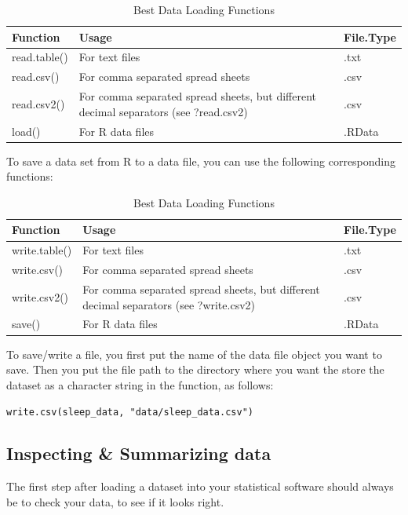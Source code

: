 \documentclass[
]{book}
\begin{document}
\begin{table}

\caption{\label{tab:data-load-types-1}Best Data Loading Functions}
\centering
\begin{tabular}[t]{lll}
\toprule
Function & Usage & File.Type\\
\midrule
read.table() & For text files & .txt\\
read.csv() & For comma separated spread sheets & .csv\\
read.csv2() & For comma separated spread sheets, but different decimal separators (see ?read.csv2) & .csv\\
load() & For R data files & .RData\\
\bottomrule
\end{tabular}
\end{table}

To save a data set from R to a data file, you can use the following corresponding functions:

\begin{table}

\caption{\label{tab:data-save-types}Best Data Loading Functions}
\centering
\begin{tabular}[t]{lll}
\toprule
Function & Usage & File.Type\\
\midrule
write.table() & For text files & .txt\\
write.csv() & For comma separated spread sheets & .csv\\
write.csv2() & For comma separated spread sheets, but different decimal separators (see ?write.csv2) & .csv\\
save() & For R data files & .RData\\
\bottomrule
\end{tabular}
\end{table}

To save/write a file, you first put the name of the data file object you want to save. Then you put the file path to the directory where you want the store the dataset as a character string in the function, as follows:

\texttt{write.csv(sleep\_data,\ "data/sleep\_data.csv")}

\subsection{Inspecting \& Summarizing data}\label{inspecting-summarizing-data}

The first step after loading a dataset into your statistical software should always be to check your data, to see if it looks right.
\end{document}
